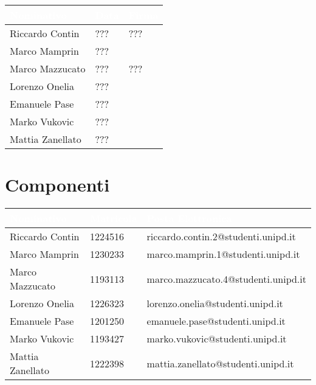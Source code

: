 \begin{center}
  \centering
  \begin{longtable}{|C{3,5cm}|C{2cm}|C{6,5cm}|}
    \hline
    \textcolor[HTML]{FFFFFF}{\textbf{Nominativo}} & \textcolor[HTML]{FFFFFF}{\textbf{Data}} & \textcolor[HTML]{FFFFFF}{\textbf{Firma}} \\ \hline
    Riccardo Contin & ??? & ??? \\ \hline
    Marco Mamprin & ??? &  \\ \hline
    Marco Mazzucato & ??? & ??? \\ \hline
    Lorenzo Onelia & ??? &  \\ \hline
    Emanuele Pase & ??? &  \\ \hline
    Marko Vukovic & ??? &  \\ \hline
    Mattia Zanellato & ??? &  \\ \hline
  \end{longtable}
\end{center}

\section{Componenti}
\renewcommand\arraystretch{1,5}

\begin{center}
  \centering
  \begin{longtable}{|C{3,3cm}|C{1,8cm}|C{7cm}|}
    \hline
    \textcolor[HTML]{FFFFFF}{\textbf{Nominativo}} & \textcolor[HTML]{FFFFFF}{\textbf{Matricola}} & \textcolor[HTML]{FFFFFF}{\textbf{Posta Elettronica}} \\ \hline
    Riccardo Contin & 1224516 & riccardo.contin.2@studenti.unipd.it \\ \hline
    Marco Mamprin & 1230233 & marco.mamprin.1@studenti.unipd.it \\ \hline
    Marco Mazzucato & 1193113 & marco.mazzucato.4@studenti.unipd.it \\ \hline
    Lorenzo Onelia & 1226323 & lorenzo.onelia@studenti.unipd.it \\ \hline
    Emanuele Pase & 1201250 & emanuele.pase@studenti.unipd.it \\ \hline
    Marko Vukovic & 1193427 & marko.vukovic@studenti.unipd.it \\ \hline
    Mattia Zanellato & 1222398 & mattia.zanellato@studenti.unipd.it \\ \hline
  \end{longtable}
\end{center}
